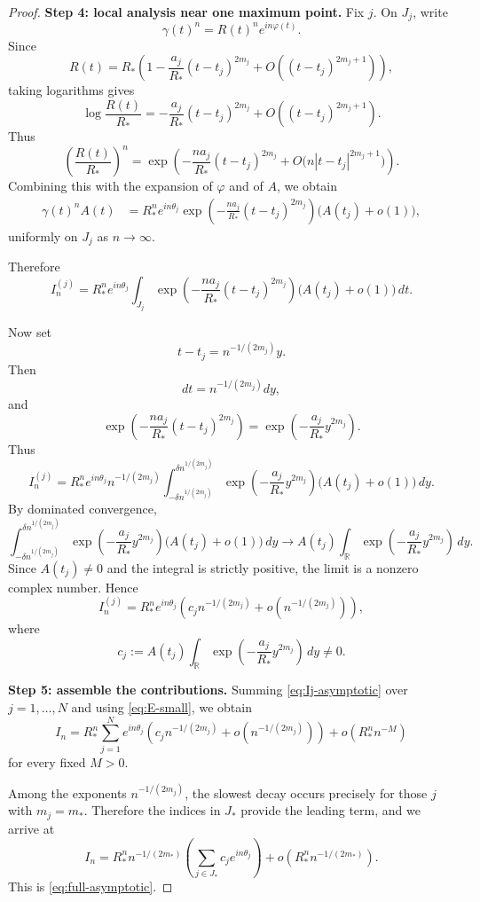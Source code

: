 \documentclass[11pt]{amsart}
\theoremstyle{remark}
\newcommand{\R}{\mathbb R}
\newcommand{\1}{\mathbf 1}
\begin{document}
\begin{proof}
\noindent\textbf{Step 4: local analysis near one maximum point.}
Fix $j$. On $J_j$, write
\[
\gamma(t)^n=R(t)^n e^{in\varphi(t)}.
\]
Since
\[
R(t)=R_*\left(1-\frac{a_j}{R_*}(t-t_j)^{2m_j}+O((t-t_j)^{2m_j+1})\right),
\]
taking logarithms gives
\[
\log\!\frac{R(t)}{R_*}
=
-\frac{a_j}{R_*}(t-t_j)^{2m_j}
+O((t-t_j)^{2m_j+1}).
\]
Thus
\[
\left(\frac{R(t)}{R_*}\right)^n
=
\exp\!\left(
-\frac{n a_j}{R_*}(t-t_j)^{2m_j}
+
O\!\bigl(n|t-t_j|^{2m_j+1}\bigr)
\right).
\]
Combining this with the expansion of $\varphi$ and of $A$, we obtain
\begin{align*}
\gamma(t)^nA(t)
&=
R_*^n e^{in\theta_j}
\exp\!\left(
-\frac{n a_j}{R_*}(t-t_j)^{2m_j}
\right)
\bigl(A(t_j)+o(1)\bigr),
\end{align*}
uniformly on $J_j$ as $n\to\infty$.

Therefore
\[
I_n^{(j)}
=
R_*^n e^{in\theta_j}
\int_{J_j}
\exp\!\left(
-\frac{n a_j}{R_*}(t-t_j)^{2m_j}
\right)
\bigl(A(t_j)+o(1)\bigr)\,dt.
\]

Now set
\[
t-t_j=n^{-1/(2m_j)}y.
\]
Then
\[
dt=n^{-1/(2m_j)}dy,
\]
and
\[
\exp\!\left(
-\frac{n a_j}{R_*}(t-t_j)^{2m_j}
\right)
=
\exp\!\left(-\frac{a_j}{R_*}y^{2m_j}\right).
\]
Thus
\[
I_n^{(j)}
=
R_*^n e^{in\theta_j} n^{-1/(2m_j)}
\int_{-\delta n^{1/(2m_j)}}^{\delta n^{1/(2m_j)}}
\exp\!\left(-\frac{a_j}{R_*}y^{2m_j}\right)
\bigl(A(t_j)+o(1)\bigr)\,dy.
\]
By dominated convergence,
\[
\int_{-\delta n^{1/(2m_j)}}^{\delta n^{1/(2m_j)}}
\exp\!\left(-\frac{a_j}{R_*}y^{2m_j}\right)
\bigl(A(t_j)+o(1)\bigr)\,dy
\to
A(t_j)\int_{\R}\exp\!\left(-\frac{a_j}{R_*}y^{2m_j}\right)\,dy.
\]
Since $A(t_j)\neq 0$ and the integral is strictly positive, the limit is a nonzero complex number. Hence
\begin{equation}\label{eq:Ij-asymptotic}
I_n^{(j)}
=
R_*^n e^{in\theta_j}
\left(
c_j n^{-1/(2m_j)}
+
o\!\left(n^{-1/(2m_j)}\right)
\right),
\end{equation}
where
\[
c_j
:=
A(t_j)\int_{\R}\exp\!\left(-\frac{a_j}{R_*}y^{2m_j}\right)\,dy
\neq 0.
\]

\medskip

\noindent\textbf{Step 5: assemble the contributions.}
Summing \eqref{eq:Ij-asymptotic} over $j=1,\dots,N$ and using \eqref{eq:E-small}, we obtain
\[
I_n
=
R_*^n
\sum_{j=1}^N e^{in\theta_j}
\left(
c_j n^{-1/(2m_j)}
+
o\!\left(n^{-1/(2m_j)}\right)
\right)
+
o(R_*^n n^{-M})
\]
for every fixed $M>0$.

Among the exponents $n^{-1/(2m_j)}$, the slowest decay occurs precisely for those $j$ with $m_j=m_*$. Therefore the indices in $J_*$ provide the leading term, and we arrive at
\[
I_n
=
R_*^n n^{-1/(2m_*)}
\left(
\sum_{j\in J_*} c_j e^{in\theta_j}
\right)
+
o\!\left(R_*^n n^{-1/(2m_*)}\right).
\]
This is \eqref{eq:full-asymptotic}.
\end{proof}
\end{document}
